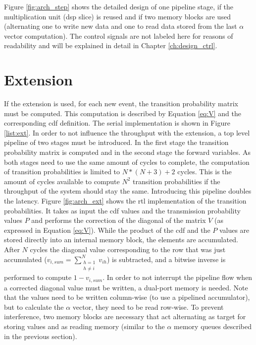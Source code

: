 \documentclass[mscthesis]{usiinfthesis}
\begin{document}
Figure \ref{fig:arch_step} shows the detailed design of one pipeline stage, if
the multiplication unit (\gls{dsp} slice) is reused and if two memory blocks
are used (alternating one to write new data and one to read data stored from
the last $\alpha$ vector computation). The control signals are not labeled here
for reasons of readability and will be explained in detail in Chapter
\ref{ch:design_ctrl}.

\section{Extension}
\label{ch:design_ext}

If the extension is used, for each new event, the transition probability matrix
must be computed. This computation is described by Equation \ref{eq:V} and the
corresponding \gls{cdf} definition. The serial implementation is shown in
Figure \ref{list:ext}. In order to not influence the throughput with the
extension, a top level pipeline of two stages must be introduced. In the first
stage the transition probability matrix is computed and in the second stage the
forward variables. As both stages need to use the same amount of cycles to
complete, the computation of transition probabilities is limited to $N*(N+3)+2$
cycles. This is the amount of cycles available to compute $N^2$ transition
probabilities if the throughput of the system should stay the same. Introducing
this pipeline doubles the latency. Figure \ref{fig:arch_ext} shows the
\gls{rtl} implementation of the transition probabilities. It takes as input the
\gls{cdf} values and the transmission probability values $P$ and performs the
correction of the diagonal of the matrix $V$ (as expressed in Equation
\ref{eq:V}). While the product of the \gls{cdf} and the $P$ values are stored
directly into an internal memory block, the elements are accumulated. After $N$
cycles the diagonal value corresponding to the row that was just accumulated
($v_{i, sum} = \sum\limits_{\substack{h=1 \\ h \neq i}}^{N} v_{ih}$) is
subtracted, and a bitwise inverse is performed to compute $1 - v_{i, sum}$. In
order to not interrupt the pipeline flow when a corrected diagonal value must
be written, a dual-port memory is needed. Note that the values need to be
written column-wise (to use a pipelined accumulator), but to calculate the
$\alpha$ vector, they need to be read row-wise. To prevent interference, two
memory blocks are necessary that act alternating as target for storing values
and as reading memory (similar to the $\alpha$ memory queues described in the
previous section).
\end{document}
